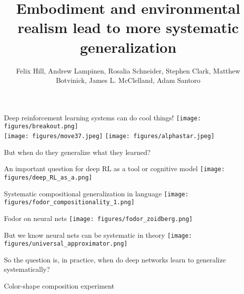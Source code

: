 \documentclass{beamer}
\begin{document}
\title{Embodiment and environmental realism lead to more systematic generalization}
\author{Felix Hill, Andrew Lampinen, Rosalia Schneider, Stephen Clark, Matthew Botvinick, James L. McClelland, Adam Santoro}
\date{}
\frame{\titlepage}

\begin{frame}{Deep reinforcement learning systems can do cool things!}
\vspace{0.5em}
\centering
\texttt{[image: figures/breakout.png]}\\[-2pt]
\texttt{[image: figures/move37.jpeg]}%
\texttt{[image: figures/alphastar.jpeg]}
\end{frame}

\begin{frame}[standout]
But when do they generalize what they learned? 
\end{frame}

\begin{frame}{An important question for deep RL as a tool or cognitive model}
\centering
\texttt{[image: figures/deep\_RL\_as\_a.png]}
\end{frame}

\begin{frame}{Systematic compositional generalization in language}
\vspace{-2em}
\centering
\texttt{[image: figures/fodor\_compositionality\_1.png]}
\end{frame}

\begin{frame}{Fodor on neural nets}
\centering
\texttt{[image: figures/fodor\_zoidberg.png]}
\end{frame}


\begin{frame}{But we know neural nets can be systematic in theory}
\centering
\texttt{[image: figures/universal\_approximator.png]}
\end{frame}

\begin{frame}[standout]
So the question is, in practice, when do deep networks learn to generalize systematically? 
\end{frame}

\begin{frame}{Color-shape composition experiment}

\end{frame}
\end{document}
